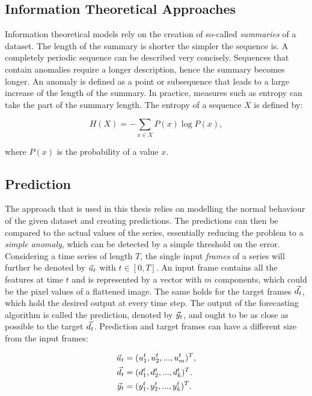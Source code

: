 \subsection{Information Theoretical Approaches}
\label{sub:information_theoretical_approaches}

Information theoretical models rely on the creation of so-called
\emph{summaries} of a dataset. The length of the summary is shorter the simpler
the sequence is.  A completely periodic sequence can be described very
concisely.  Sequences that contain anomalies require a longer description,
hence the summary becomes longer. An anomaly is defined as a point or
subsequence that leads to a large increase of the length of the summary.  In
practice, measures such as entropy can take the part of the summary length. The
entropy of a sequence $X$ is defined by:

\begin{equation}
  H(X) = - \sum_{x \in X} P(x) \log P(x),
\end{equation}

where $P(x)$ is the probability of a value $x$.



\subsection{Prediction}
\label{sub:prediction}

The approach that is used in this thesis relies on modelling the normal
behaviour of the given dataset and creating predictions. The predictions can
then be compared to the actual values of the series, essentially reducing the
problem to a \emph{simple anomaly}, which can be detected by a simple threshold
on the error.\\
Considering a time series of length $T$, the single input \emph{frames} of a
series will further be denoted by $\vec{u}_t$ with $t \in [0,T]$.  An input frame
contains all the features at time $t$ and is represented by a vector with $m$
components, which could be the pixel values of a flattened image.  The same
holds for the target frames $\vec{d}_t$, which hold the desired output at every
time step. The output of the forecasting algorithm is called the prediction,
denoted by $\vec{y}_t$, and ought to be as close as possible to the target
$\vec{d}_t$.  Prediction and target frames can have a different size from the
input frames:

\begin{align}
  \vec{u}_t &= (u^t_1, u^t_2, ..., u^t_m)^T, \nonumber\\
  \vec{d}_t &= (d^t_1, d^t_2, ..., d^t_k)^T. \\
  \vec{y}_t &= (y^t_1, y^t_2, ..., y^t_k)^T. \nonumber
\end{align}

